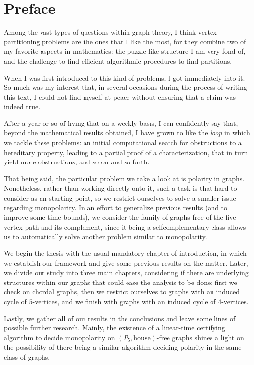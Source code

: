 \chapter*{Preface}

Among the vast types of questions within graph theory, I think
vertex-partitioning problems are the ones that I like the most, for they combine
two of my favorite aspects in mathematics: the puzzle-like structure I am very
fond of, and the challenge to find efficient algorithmic procedures to find
partitions.

When I was first introduced to this kind of problems, I got immediately into it.
So much was my interest that, in several occasions during the process of writing
this text, I could not find myself at peace without ensuring that a claim was
indeed true.

After a year or so of living that on a weekly basis, I can confidently say that,
beyond the mathematical results obtained, I have grown to like the \textit{loop}
in which we tackle these problems: an initial computational search for
obstructions to a hereditary property, leading to a partial proof of a
characterization, that in turn yield more obstructions, and so on and so forth.

That being said, the particular problem we take a look at is polarity in graphs.
Nonetheless, rather than working directly onto it, such a task is that hard to
consider as an starting point, so we restrict ourselves to solve a smaller issue
regarding monopolarity. In an effort to generalize previous results (and to
improve some time-bounds), we consider the family of graphs free of the five
vertex path and its complement, since it being a selfcomplementary class allows
us to automatically solve another problem similar to monopolarity.

We begin the thesis with the usual mandatory chapter of introduction, in which
we establish our framework and give some previous results on the matter. Later,
we divide our study into three main chapters, considering if there are
underlying structures within our graphs that could ease the analysis to be done:
first we check on chordal graphs, then we restrict ourselves to graphs with an
induced cycle of $5$-vertices, and we finish with graphs with an induced cycle
of $4$-vertices.

Lastly, we gather all of our results in the conclusions and leave some lines of
possible further research. Mainly, the existence of a linear-time certifying
algorithm to decide monopolarity on $(P_5,\text{house})$-free graphs shines a
light on the possibility of there being a similar algorithm deciding polarity in
the same class of graphs.